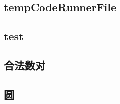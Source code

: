 \subsection{tempCodeRunnerFile}
\raggedbottom
\hrulefill

\subsection{test}
\raggedbottom
\hrulefill

\subsection{合法数对}
\raggedbottom
\hrulefill

\subsection{圆}
\raggedbottom
\hrulefill

